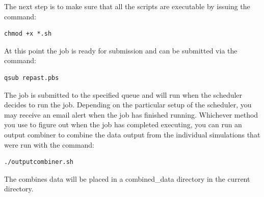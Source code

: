 \documentclass[11pt]{amsart}
\begin{document}
The next step is to make sure that all the scripts are executable by issuing the command:
\begin{verbatim}
chmod +x *.sh
\end{verbatim}
At this point the job is ready for submission and can be submitted via the command:
\begin{verbatim}
qsub repast.pbs
\end{verbatim}

The job is submitted to the specified queue and will run when the scheduler decides to run the job. Depending on the particular setup of the scheduler, you may receive an email alert when the job has finished running. Whichever method you use to figure out when the job has completed executing, you can run an output combiner to combine the data output from the individual simulations that were run with the command:
\begin{verbatim}
./outputcombiner.sh
\end{verbatim}
The combines data will be placed in a combined\_data directory in the current directory.
\end{document}
